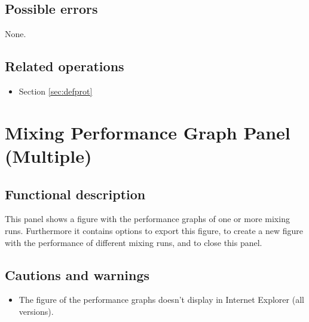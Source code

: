   \subsection*{Possible errors}
  None.

  \subsection*{Related operations}
   \begin{itemize}
   \item Section \ref{sec:defprot}
  \end{itemize}

\section{Mixing Performance Graph Panel (Multiple)}
\label{sec:mulperfgraph}
  \subsection*{Functional description}
  This panel shows a figure with the performance graphs of one or more mixing runs. Furthermore it contains options to export this figure, to create a new figure with the performance of different mixing runs, and to close this panel.

  \subsection*{Cautions and warnings}
  \begin{itemize}
  \item The figure of the performance graphs doesn't display in Internet Explorer (all versions).
  \end{itemize}

